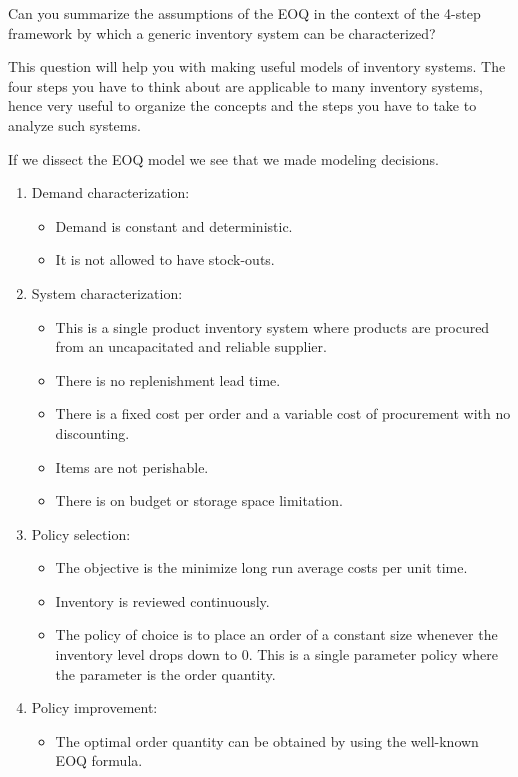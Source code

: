 \begin{question}
  Can you summarize the assumptions of the EOQ in the context of the 4-step framework by which
  a generic inventory system can be characterized?

  This question will help you with making useful models of inventory
  systems. The four steps you have to think about are applicable to
  many inventory systems, hence very useful to organize the concepts
  and the steps you have to take to analyze such systems.
\end{question}

  \begin{solution}
If we dissect the EOQ model we see that we made modeling decisions.
\begin{enumerate}
\item Demand characterization: 
\begin{itemize}
\item Demand is constant and deterministic.
\item It is not allowed to have stock-outs.
\end{itemize}
\item System characterization: 
\begin{itemize}
\item This is a single product inventory system where products are procured from an uncapacitated and reliable supplier. 
\item There is no replenishment lead time.
\item There is a fixed cost per order and a variable cost of procurement with no discounting. 
\item Items are not perishable.
\item There is on budget or storage space limitation.
\end{itemize}
\item Policy selection:
\begin{itemize}
\item The objective is the minimize long run average costs per unit time. 
\item Inventory is reviewed continuously.
\item The policy of choice is to place an order of a constant size whenever the inventory level drops down to 0. This is a single parameter policy where the parameter is the order quantity.
\end{itemize}
\item Policy improvement:
\begin{itemize}
\item The optimal order quantity can be obtained by using the well-known EOQ formula.
\end{itemize}
\end{enumerate}
  \end{solution}


